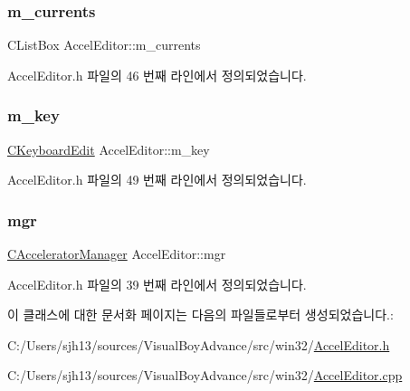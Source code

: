 \subsubsection{\texorpdfstring{m\+\_\+currents}{m\_currents}}
{\footnotesize\ttfamily C\+List\+Box Accel\+Editor\+::m\+\_\+currents}



Accel\+Editor.\+h 파일의 46 번째 라인에서 정의되었습니다.

\mbox{\label{class_accel_editor_af0875f914fdddf5233a951cabd499a4d}} 
\subsubsection{\texorpdfstring{m\+\_\+key}{m\_key}}
{\footnotesize\ttfamily \mbox{\hyperlink{class_c_keyboard_edit}{C\+Keyboard\+Edit}} Accel\+Editor\+::m\+\_\+key}



Accel\+Editor.\+h 파일의 49 번째 라인에서 정의되었습니다.

\mbox{\label{class_accel_editor_acb731e2193cb5022a95e83122651f96d}} 
\subsubsection{\texorpdfstring{mgr}{mgr}}
{\footnotesize\ttfamily \mbox{\hyperlink{class_c_accelerator_manager}{C\+Accelerator\+Manager}} Accel\+Editor\+::mgr}



Accel\+Editor.\+h 파일의 39 번째 라인에서 정의되었습니다.



이 클래스에 대한 문서화 페이지는 다음의 파일들로부터 생성되었습니다.\+:\begin{DoxyCompactItemize}
\item 
C\+:/\+Users/sjh13/sources/\+Visual\+Boy\+Advance/src/win32/\mbox{\hyperlink{_accel_editor_8h}{Accel\+Editor.\+h}}\item 
C\+:/\+Users/sjh13/sources/\+Visual\+Boy\+Advance/src/win32/\mbox{\hyperlink{_accel_editor_8cpp}{Accel\+Editor.\+cpp}}\end{DoxyCompactItemize}
